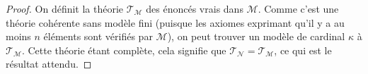 \begin{proof}
  On définit la théorie $\mathcal T_{\mathcal M}$ des énoncés vrais dans
  $\mathcal M$. Comme c'est une théorie cohérente sans modèle fini (puisque
  les axiomes exprimant qu'il y a au moins $n$ éléments sont vérifiés par
  $\mathcal M$), on peut trouver un modèle de cardinal $\kappa$ à
  $\mathcal T_{\mathcal M}$. Cette théorie étant complète, cela signifie que
  $\mathcal T_{\mathcal N} = \mathcal T_{\mathcal M}$, ce qui est le
  résultat attendu.
\end{proof}

